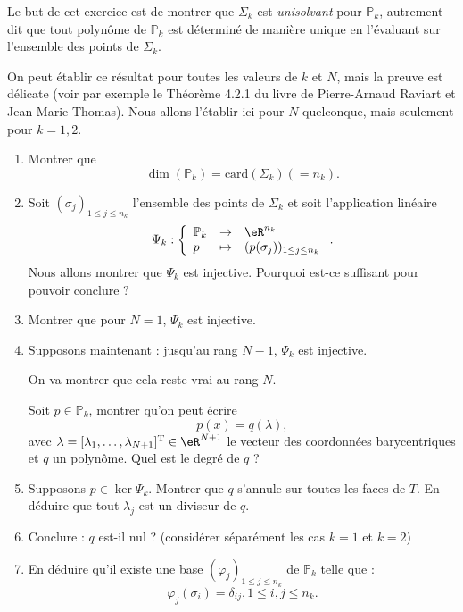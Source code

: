 \begin{exercice}\label{exoChPk_unisolvant}

Le but de cet exercice est de montrer que $\Sigma_k$ est \emph{unisolvant} pour $\mathbb{P}_k$, autrement dit que tout polynôme de $\mathbb{P}_k$ est déterminé de manière unique en l'évaluant sur l'ensemble des points de $\Sigma_k$.

\medskip

On peut établir ce résultat pour toutes les valeurs de $k$ et $N$, mais la preuve est délicate (voir par exemple le Théorème 4.2.1 du livre de Pierre-Arnaud Raviart et Jean-Marie Thomas). Nous allons l'établir ici pour $N$ quelconque, mais seulement pour $k=1,2$.

\begin{enumerate}

\item Montrer que $$\dim(\mathbb{P}_k) = \mbox{card}(\Sigma_k) (=n_k).$$

\item Soit $(\sigma_j)_{1\leq j\leq n_k}$ l'ensemble des points de $\Sigma_k$ et soit l'application linéaire
\[
\Psi_k : \left \{
\begin{array}{lcl}
\mathbb{P}_k &\rightarrow &\eR^{n_k}\\
p & \mapsto & (p(\sigma_j))_{1\leq j\leq n_k}
\end{array}
\right. .
\]
Nous allons montrer que $\Psi_k$ est injective. Pourquoi est-ce suffisant pour pouvoir conclure ?

\item Montrer que pour $N=1$, $\Psi_k$ est injective.

\item Supposons maintenant : jusqu'au rang $N-1$, $\Psi_k$ est injective. 

On va montrer que cela reste vrai au rang $N$.

Soit $p\in\mathbb{P}_k$, montrer qu'on peut écrire 
\[
p(x) = q(\lambda),
\]
avec $\lambda = [\lambda_1,\ldots,\lambda_{N+1}]^\mathrm{T}\in \eR^{N+1}$ le vecteur des coordonnées barycentriques et $q$ un polynôme. Quel est le degré de $q$ ?

\item Supposons $p \in \ker{\Psi_k}$. Montrer que $q$ s'annule sur toutes les faces de $T$. En déduire que tout $\lambda_j$ est un diviseur de $q$.

\item Conclure : $q$ est-il nul ? (considérer séparément les cas $k=1$ et $k=2$)

\item En déduire qu'il existe une base $(\varphi_j)_{1\leq j\leq n_k}$ de $\mathbb{P}_k$ telle que :
\[
\varphi_j(\sigma_i) = \delta_{ij}, 1 \leq i,j \leq n_k.
\]

\end{enumerate}

\end{exercice}


